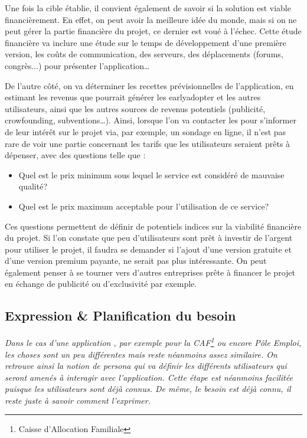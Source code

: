 Une fois la cible établie, il convient également de savoir si la solution est viable financièrement. En effet, on peut avoir la meilleure idée du monde, mais si on ne peut gérer la partie financière du projet, ce dernier est voué à l'échec. Cette étude financière va inclure une étude sur le temps de développement d'une première version, les coûts de communication, des serveurs, des déplacements (forums, congrès...) pour présenter l'application\ldots

De l'autre côté, on va déterminer les recettes prévisionnelles de l'application, en estimant les revenus que pourrait générer les \gls{earlyadopter} et les autres utilisateurs, ainsi que les autres sources de revenus potentiels (publicité, crowfounding, subventions\ldots). Ainsi, lorsque l'on va contacter les  pour s'informer de leur intérêt sur le projet via, par exemple, un sondage en ligne, il n'est pas rare de voir une partie concernant les tarifs que les utilisateurs seraient prêts à dépenser, avec des questions telle que :

\begin{itemize}
	\setlength\itemsep{-0.5em}
	\item Quel est le prix minimum sous lequel le service est considéré de mauvaise qualité?
	\item Quel est le prix maximum acceptable pour l'utilisation de ce service?
\end{itemize}

Ces questions permettent de définir de potentiels indices sur la viabilité financière du projet. Si l'on constate que peu d'utilisateurs sont prêt à investir de l'argent pour utiliser le projet, il faudra se demander si l'ajout d'une version gratuite et d'une version premium payante, ne serait pas plus intéressante. On peut également penser à se tourner vers d'autres entreprises prête à financer le projet en échange de publicité ou d'exclusivité par exemple.

\subsection{Expression \& Planification du besoin}

{\em 
Dans le cas d'une application , par exemple pour la CAF\footnote{Caisse d'Allocation Familiale} ou encore Pôle Emploi, les choses sont un peu différentes mais reste néanmoins assez similaire. On retrouve ainsi la notion de \gls{persona} qui va définir les différents utilisateurs qui seront amenés à interagir avec l'application. Cette étape est néanmoins facilitée puisque les utilisateurs sont déjà connus. De même, le besoin est déjà connu, il reste juste à savoir comment l'exprimer.
}

